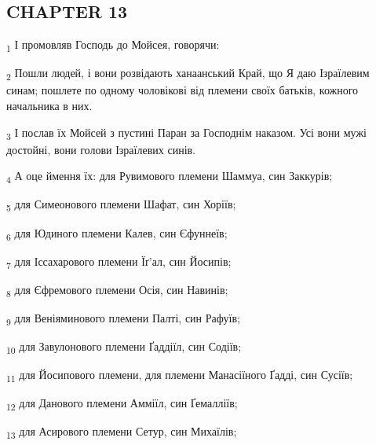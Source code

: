 \subsection{CHAPTER 13}
\begin{tcolorbox}
\textsubscript{1} І промовляв Господь до Мойсея, говорячи:
\end{tcolorbox}
\begin{tcolorbox}
\textsubscript{2} Пошли людей, і вони розвідають ханаанський Край, що Я даю Ізраїлевим синам; пошлете по одному чоловікові від племени своїх батьків, кожного начальника в них.
\end{tcolorbox}
\begin{tcolorbox}
\textsubscript{3} І послав їх Мойсей з пустині Паран за Господнім наказом. Усі вони мужі достойні, вони голови Ізраїлевих синів.
\end{tcolorbox}
\begin{tcolorbox}
\textsubscript{4} А оце ймення їх: для Рувимового племени Шаммуа, син Заккурів;
\end{tcolorbox}
\begin{tcolorbox}
\textsubscript{5} для Симеонового племени Шафат, син Хоріїв;
\end{tcolorbox}
\begin{tcolorbox}
\textsubscript{6} для Юдиного племени Калев, син Єфуннеїв;
\end{tcolorbox}
\begin{tcolorbox}
\textsubscript{7} для Іссахарового племени Їґ'ал, син Йосипів;
\end{tcolorbox}
\begin{tcolorbox}
\textsubscript{8} для Єфремового племени Осія, син Навинів;
\end{tcolorbox}
\begin{tcolorbox}
\textsubscript{9} для Веніяминового племени Палті, син Рафуїв;
\end{tcolorbox}
\begin{tcolorbox}
\textsubscript{10} для Завулонового племени Ґаддіїл, син Содіїв;
\end{tcolorbox}
\begin{tcolorbox}
\textsubscript{11} для Йосипового племени, для племени Манасіїного Ґадді, син Сусіїв;
\end{tcolorbox}
\begin{tcolorbox}
\textsubscript{12} для Данового племени Амміїл, син Ґемалліїв;
\end{tcolorbox}
\begin{tcolorbox}
\textsubscript{13} для Асирового племени Сетур, син Михаїлів;
\end{tcolorbox}
